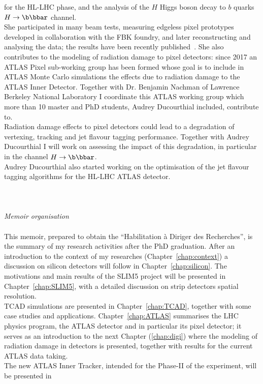 for the HL-LHC phase, and the analysis of the $H$ Higgs boson decay to $b$ quarks
 $H\to\b\bbar$ channel.
\\She participated in many beam tests, measuring 
edgeless pixel prototypes developed in collaboration with the FBK foundry, and later reconstructing 
and analysing the data; the results have been recently published~\cite{1748-0221-12-05-P05006}. 
She also contributes to the modeling of radiation damage to pixel detectors: since 2017 
an ATLAS Pixel sub-working group has been formed whose goal is to include in ATLAS Monte Carlo 
simulations the effects due to radiation damage to the ATLAS Inner Detector. Together 
with Dr. Benjamin Nachman of Lawrence Berkeley National Laboratory I coordinate this 
ATLAS working group  which more than 10 master and PhD students, Audrey Ducourthial included, contribute to.
\\
Radiation damage effects to pixel detectors could lead to a degradation of vertexing, tracking 
and jet flavour tagging performance. Together with Audrey  Ducourthial I will   work on assessing the impact of this 
degradation, in particular in the channel $H\to\b\bbar$. 
\\Audrey  Ducourthial also started working on the optimisation of the jet flavour tagging algorithms for the
HL-LHC  ATLAS detector. 
\\
\\
\\
\\
{\it Memoir organisation}
\\
\\This memoir, prepared to obtain the ``Habilitation \`a Diriger des Recherches'', is the summary of my 
research activities after the PhD graduation. After an introduction to the context of my researches 
(Chapter~\ref{chap:context}) a discussion on silicon detectors will follow in Chapter~\ref{chap:silicon}.
The motivations and main results of the SLIM5 project will be presented in Chapter~\ref{chap:SLIM5}, 
with a detailed discussion on strip detectors spatial resolution.
\\TCAD simulations are presented in Chapter~\ref{chap:TCAD}, together with some case studies 
and applications.
Chapter~\ref{chap:ATLAS} summarises  the LHC physics program, the ATLAS detector and 
in particular its pixel detector; it serves as an introduction to the next Chapter (\ref{chap:digi}) where 
the modeling of radiation damage in detectors is presented, together with results for the 
current ATLAS data taking.
\\The new ATLAS Inner Tracker, intended for the Phase-II of the experiment, will be presented in 
